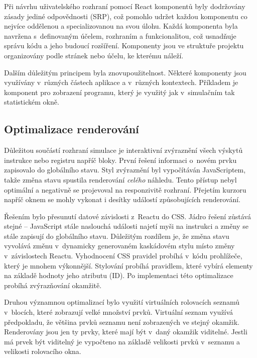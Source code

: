 Při návrhu uživatelského rozhraní pomocí React komponentů byly dodržovány zásady jediné odpovědnosti (SRP), což pomohlo udržet každou komponentu co nejvíce oddělenou a specializovanou na svou úlohu.
Každá komponenta byla navržena s~definovaným účelem, rozhraním a funkcionalitou, což usnadňuje správu kódu a jeho budoucí rozšíření.
Komponenty jsou ve struktuře projektu organizovány podle stránek nebo účelu, ke kterému náleží.

Dalším důležitým principem byla znovupoužitelnost.
Některé komponenty jsou využívány v~různých částech aplikace a v~různých kontextech.
Příkladem je komponent pro zobrazení programu, který je využitý jak v~simulačním tak statistickém okně.

\subsection{Optimalizace renderování}
\label{optimRender}

Důležitou součástí rozhraní simulace je interaktivní zvýraznění všech výskytů instrukce nebo registru napříč bloky.
První řešení informaci o~novém  prvku zapisovalo do globálního stavu.
Styl zvýraznění byl vypočítáván JavaScriptem, takže změna stavu spustila renderování \emph{celého} náhledu.
Tento přístup nebyl optimální a negativně se projevoval na responzivitě rozhraní.
Přejetím kurzoru napříč oknem se mohly vykonat i desítky událostí způsobujících renderování.

Řešením bylo přesunutí datové závislosti z~Reactu do CSS.
Jádro řešení zůstává stejné -- JavaScript stále naslouchá události najetí myši na instrukci a změny se stále zapisují do globálního stavu.
Důležitým rozdílem je, že změna stavu vyvolává změnu v~dynamicky generovaném kaskádovém stylu místo změny v~závislostech Reactu. 
Vyhodnocení CSS pravidel probíhá v~kódu prohlížeče, který je mnohem výkonnější.
Stylování probíhá pravidlem, které vybírá elementy na základě hodnoty jeho atributu (ID).
Po implementaci této optimalizace probíhá zvýrazňování okamžitě.

Druhou významnou optimalizací bylo využití virtuálních rolovacích seznamů v~blocích, které zobrazují velké množství prvků.
Virtuální seznam využívá předpokladu, že většina prvků seznamu není zobrazených ve stejný okamžik.
Renderovány jsou jen ty prvky, které mají být v~daný okamžik viditelné.
Jestli má prvek být viditelný je vypočteno na základě velikosti prvků v~seznamu a velikosti rolovacího okna.

